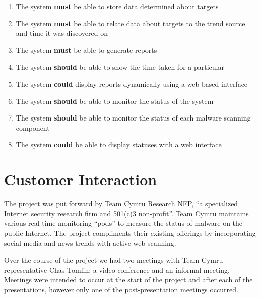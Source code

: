 \begin{enumerate}
    \item The system \textbf{must} be able to store data determined about targets
    \item The system \textbf{must} be able to relate data about targets to the trend source and time it was discovered on
    \item The system \textbf{must} be able to generate reports
    \item The system \textbf{should} be able to show the time taken for a particular 
    \item The system \textbf{could} display reports dynamically using a web based interface
    \item The system \textbf{should} be able to monitor the status of the system
    \item The system \textbf{should} be able to monitor the status of each malware scanning component
    \item The system \textbf{could} be able to display statuses with a web interface
\end{enumerate}

\section{Customer Interaction}
The project was put forward by Team Cymru Research NFP, ``a specialized Internet security research firm and 501(c)3 non-profit''\cite{team-cymru}. Team Cymru maintains various real-time monitoring ``pods'' to measure the status of malware on the public Internet. The project compliments their existing offerings by incorporating social media and news trends with active web scanning.

Over the course of the project we had two meetings with Team Cymru representative Chas Tomlin: a video conference and an informal meeting.  Meetings were intended to occur at the start of the project and after each of the presentations, however only one of the post-presentation meetings occurred.

